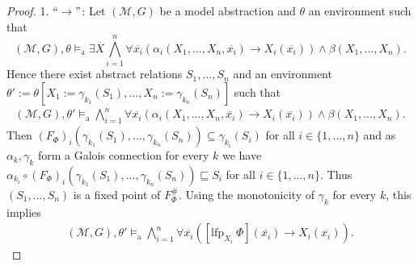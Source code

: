 \documentclass[10pt,a4paper]{amsart}
\newcommand{\calM}{\mathcal{M}}
\newcommand{\impl}{\rightarrow} %
\newcommand{\lfp}{\mathrm{lfp}} %
\newcommand{\modelsa}{\models_\mathrm{a}} %
\newcommand{\mybar}[1]{\overline{#1}}
\begin{document}
\begin{proof}
	1. $``\rightarrow"$: Let $(\calM,G)$ be a model abstraction and $\theta$ an environment such that
	\[
	(\calM,G),\theta \modelsa \exists \mybar{X} \bigwedge_{i=1}^n \forall \mybar{x_i} \left(\alpha_i(X_1,...,X_n,\mybar{x_i}) \impl X_i(\mybar{x_i})\right) \wedge \beta(X_1,...,X_n).
	\]
	Hence there exist abstract relations $S_1,...,S_n$ and an environment $\theta' := \theta[X_1 := \gamma_{k_1}(S_1),...,X_n := \gamma_{k_n}(S_n)]$  such that 
	\begin{align}\label{abstractNonnengartproof}
		(\calM,G),\theta' \modelsa \bigwedge_{i=1}^n \forall \mybar{x_i} \left(\alpha_i(X_1,...,X_n,\mybar{x_i}) \impl X_i(\mybar{x_i})\right) \wedge \beta(X_1,...,X_n).
	\end{align}
Then $(F_{\Phi})_i(\gamma_{k_1}(S_1),...,\gamma_{k_n}(S_n)) \subseteq \gamma_{k_i}(S_i)$ for all $i \in \{1,...,n\}$ and as $\alpha_k,\gamma_k$ form a Galois connection for every $k$ we have $\alpha_{k_i} \circ (F_{\Phi})_i(\gamma_{k_1}(S_1),...,\gamma_{k_n}(S_n)) \sqsubseteq S_i$ for all $i \in \{1,...,n\}$. Thus $(S_1,...,S_n)$ is a fixed point of $F_{\Phi}^{\#}$. Using the monotonicity of $\gamma_k$ for every $k$, this implies
\begin{align}\label{abstactNonnengartproofPart2}
	(\calM,G),\theta' \modelsa \bigwedge_{i=1}^n \forall \mybar{x_i} ([\lfp_{X_i} ~\Phi](\mybar{x_i}) \impl X_i(\mybar{x_i})).
\end{align}


\end{proof}
\end{document}
